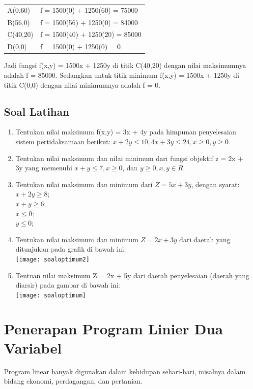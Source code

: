 \documentclass[11pt,fleqn]{book} %
\begin{document}
\begin{tabular}{l l}
A(0,60) & f = 1500(0) + 1250(60) = 75000 \\
B(56,0) & f = 1500(56) + 1250(0) = 84000 \\
C(40,20) & f = 1500(40) + 1250(20) = 85000 \\
D(0,0) & f = 1500(0) + 1250(0) = 0 \\
\end{tabular}

Jadi fungsi f(x,y) = 1500x + 1250y di titik C(40,20) dengan nilai maksimumnya adalah f = 85000. Sedangkan untuk titik minimum f(x,y) = 1500x + 1250y di titik C(0,0) dengan nilai minimumnya adalah f = 0.

\subsection{Soal Latihan }


\begin{exercise}

\begin{enumerate}
\item Tentukan nilai maksimum f(x,y) = 3x + 4y pada himpunan penyelesaian sistem pertidaksamaan berikut: $x + 2y \le 10, 4x + 3y \le 24, x \ge 0, y \ge 0.$
\item Tentukan nilai maksimum dan nilai minimum dari fungsi objektif z = 2x + 3y yang memenuhi $x + y \le 7, x \ge 0$, dan $y \ge 0, x,y \in R.$
\item Tentukan nilai maksimum dan minimum dari $Z = 5x + 3y$, dengan syarat:\\
$x + 2y \ge 8;$\\
$x + y \ge 6;$\\
$x \le 0;$\\
$y \le 0;$\\
\item Tentukan nilai maksimum dan minimum $Z = 2x + 3y $ dari daerah yang ditunjukan pada grafik di bawah ini:\\
\texttt{[image: soaloptimum2]}
\item Tentuan nilai maksimum Z = 2x + 5y dari daerah penyelesaian (daerah yang diarsir) pada gambar di bawah ini:\\
\texttt{[image: soaloptimum]}
\end{enumerate}
\end{exercise}

\section{Penerapan Program Linier Dua Variabel}
Program linear banyak digunakan dalam kehidupan sehari-hari, misalnya dalam bidang ekonomi, perdagangan, dan pertanian.\\
\end{document}
